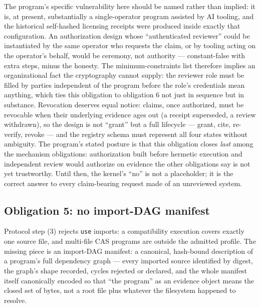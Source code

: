 The program's specific vulnerability here should be named rather than implied: it is, at present, substantially a single-operator program assisted by AI tooling, and the historical self-hashed licensing receipts were produced inside exactly that configuration. An authorization design whose ``authenticated reviewer'' could be instantiated by the same operator who requests the claim, or by tooling acting on the operator's behalf, would be ceremony, not authority --- constant-false with extra steps, minus the honesty. The minimum-constraints list therefore implies an organizational fact the cryptography cannot supply: the reviewer role must be filled by parties independent of the program before the role's credentials mean anything, which ties this obligation to obligation 6 not just in sequence but in substance. Revocation deserves equal notice: claims, once authorized, must be revocable when their underlying evidence ages out (a receipt superseded, a review withdrawn), so the design is not ``grant'' but a full lifecycle --- grant, cite, re-verify, revoke --- and the registry schema must represent all four states without ambiguity. The program's stated posture is that this obligation closes \emph{last} among the mechanism obligations: authorization built before hermetic execution and independent review would authorize on evidence the other obligations say is not yet trustworthy. Until then, the kernel's ``no'' is not a placeholder; it is the correct answer to every claim-bearing request made of an unreviewed system.

\subsection{Obligation 5: no import-DAG manifest}\label{evid:ob:importdag}

Protocol step (3) rejects \texttt{use} imports: a compatibility execution covers exactly one source file, and multi-file CAS programs are outside the admitted profile. The missing piece is an import-DAG manifest: a canonical, hash-bound description of a program's full dependency graph --- every imported source identified by digest, the graph's shape recorded, cycles rejected or declared, and the whole manifest itself canonically encoded so that ``the program'' as an evidence object means the closed set of bytes, not a root file plus whatever the filesystem happened to resolve.

